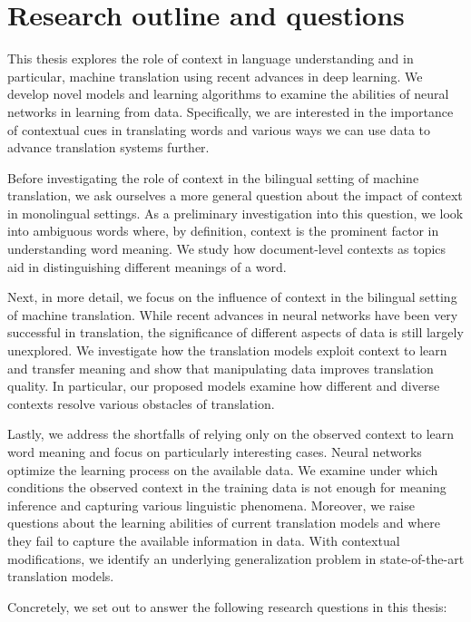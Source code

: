 
\section{Research outline and questions}
\label{section:introduction:rqs}


This thesis explores the role of context in language understanding and in particular, machine translation using recent advances in deep learning.
We develop novel models and learning algorithms to examine the abilities of neural networks in learning from data. 
Specifically, we are interested in the importance of contextual cues in translating words and various ways we can use data to advance translation systems further. 

Before investigating the role of context in the bilingual setting of machine translation, we ask ourselves a more general question about the impact of context in monolingual settings.
As a preliminary investigation into this question, we look into ambiguous words where, by definition, context is the prominent factor in understanding word meaning. 
We study how document-level contexts as topics aid in distinguishing different meanings of a word. 

Next, in more detail, we focus on the influence of context in the bilingual setting of machine translation. 
While recent advances in neural networks have been very successful in translation, the significance of different aspects of data is still largely unexplored.
We investigate how the translation models exploit context to learn and transfer meaning and show that manipulating data improves translation quality.
In particular, our proposed models examine how different and diverse contexts resolve various obstacles of translation.

Lastly, we address the shortfalls of relying only on the observed context to learn word meaning and focus on particularly interesting cases. 
Neural networks optimize the learning process on the available data. 
We examine under which conditions the observed context in the training data is not enough for meaning inference and capturing various linguistic phenomena. 
Moreover, we raise questions about the learning abilities of current translation models and where they fail to capture the available information in data. 
With contextual modifications, we identify an underlying generalization problem in state-of-the-art translation models.

Concretely, we set out to answer the following research questions in this thesis:


